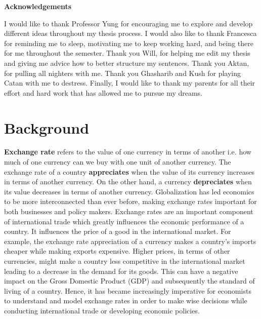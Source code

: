 \documentclass[12pt, a4paper]{report}
\begin{document}
\newpage

\vspace*{0.3cm}

{\LARGE \textbf{Acknowledgements}\par}

\vspace*{6mm}

I would like to thank Professor Yung for encouraging me to explore and develop different ideas throughout my thesis process. I would also like to thank Francesca for reminding me to sleep, motivating me to keep working hard, and being there for me throughout the semester. Thank you Will, for helping me edit my thesis and giving me advice how to better structure my sentences. Thank you Aktan, for pulling all nighters with me. Thank you Ghasharib and Kush for playing Catan with me to destress. Finally, I would like to thank my parents for all their effort and hard work that has allowed me to pursue my dreams.
\newpage

\tableofcontents

\chapter{Background}
\textbf{Exchange rate} refers to the value of one currency in terms of another i.e. how much of one currency can we buy with one unit of another currency. The exchange rate of a country \textbf{appreciates} when the value of its currency increases in terms of another currency. On the other hand, a currency \textbf{depreciates} when its value decreases in terms of another currency. Globalization has led economics to be more interconnected than ever before, making exchange rates important for both businesses and policy makers. Exchange rates are an important component of international trade which greatly influences the economic performance of a country. It influences the price of a good in the international market. For example, the exchange rate appreciation of a currency makes a country's imports cheaper while making exports expensive. Higher prices, in terms of other currencies, might make a country less competitive in the international market leading to a decrease in the demand for its goods. This can have a negative impact on the Gross Domestic Product (GDP) and subsequently the standard of living of a country. Hence, it has became increasingly imperative for economists to understand and model exchange rates in order to make wise decisions while conducting international trade or developing economic policies.
\end{document}
